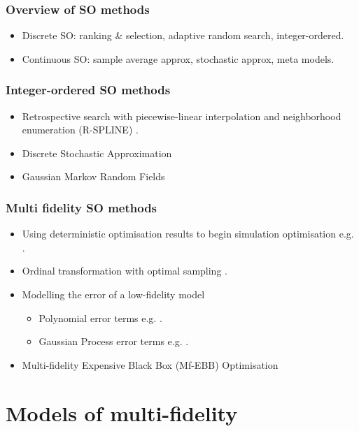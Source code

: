 \documentclass{article}
\begin{document}
\subsubsection{Overview of SO methods}

\begin{itemize}[noitemsep]
\item Discrete SO: ranking \& selection, adaptive random search, integer-ordered.
\item Continuous SO: sample average approx, stochastic approx, meta models.
\end{itemize}

\subsubsection{Integer-ordered SO methods}
\begin{itemize} [noitemsep]
    \item Retrospective search with piecewise-linear interpolation and neighborhood enumeration (R-SPLINE) \citep{wang2013integer}.
    \item Discrete Stochastic Approximation \citep{lim2012stochastic}
    \item Gaussian Markov Random Fields \citep{l2019gaussian}
\end{itemize}

\subsubsection{Multi fidelity SO methods}

\begin{itemize}[noitemsep]
\item Using deterministic optimisation results to begin simulation optimisation e.g. \cite{jian2015introduction}.
\item Ordinal transformation with optimal sampling \citep{xu2016mo2tos}.
\item Modelling the error of a low-fidelity model
\begin{itemize}[noitemsep]
\item Polynomial error terms e.g. \cite{chong2018simulation}.
\item Gaussian Process error terms e.g. \cite{huang2006sequential}.
\end{itemize}
\item Multi-fidelity Expensive Black Box (Mf-EBB) Optimisation
\end{itemize}

\section{Models of multi-fidelity} \label{models}
\end{document}

